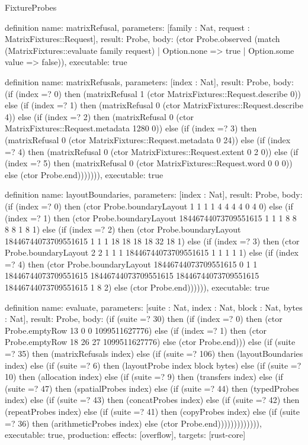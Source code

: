 \begin{lexlean}{FixtureProbes}
\begin{semanticmodule}
definition{
  name: matrixRefusal,
  parameters: [family : Nat, request : MatrixFixtures::Request],
  result: Probe,
  body: (ctor Probe.observed (match (MatrixFixtures::evaluate family request)
    | Option.none => true
    | Option.some value => false)),
  executable: true
}

definition{
  name: matrixRefusals,
  parameters: [index : Nat],
  result: Probe,
  body: (if (index =? 0) then (matrixRefusal 1 (ctor MatrixFixtures::Request.describe 0)) else (if (index =? 1) then (matrixRefusal 0 (ctor MatrixFixtures::Request.describe 4)) else (if (index =? 2) then (matrixRefusal 0 (ctor MatrixFixtures::Request.metadata 1280 0)) else (if (index =? 3) then (matrixRefusal 0 (ctor MatrixFixtures::Request.metadata 0 24)) else (if (index =? 4) then (matrixRefusal 0 (ctor MatrixFixtures::Request.extent 0 2 0)) else (if (index =? 5) then (matrixRefusal 0 (ctor MatrixFixtures::Request.word 0 0 0)) else (ctor Probe.end))))))),
  executable: true
}

definition{
  name: layoutBoundaries,
  parameters: [index : Nat],
  result: Probe,
  body: (if (index =? 0) then (ctor Probe.boundaryLayout 1 1 1 1 4 4 4 4 0 4 0) else (if (index =? 1) then (ctor Probe.boundaryLayout 18446744073709551615 1 1 1 8 8 8 8 1 8 1) else (if (index =? 2) then (ctor Probe.boundaryLayout 18446744073709551615 1 1 1 18 18 18 18 32 18 1) else (if (index =? 3) then (ctor Probe.boundaryLayout 2 2 1 1 1 18446744073709551615 1 1 1 1 1) else (if (index =? 4) then (ctor Probe.boundaryLayout 18446744073709551615 0 1 1 18446744073709551615 18446744073709551615 18446744073709551615 18446744073709551615 1 8 2) else (ctor Probe.end)))))),
  executable: true
}

definition{
  name: evaluate,
  parameters: [suite : Nat, index : Nat, block : Nat, bytes : Nat],
  result: Probe,
  body: (if (suite =? 30) then (if (index =? 0) then (ctor Probe.emptyRow 13 0 0 1099511627776) else (if (index =? 1) then (ctor Probe.emptyRow 18 26 27 1099511627776) else (ctor Probe.end))) else (if (suite =? 35) then (matrixRefusals index) else (if (suite =? 106) then (layoutBoundaries index) else (if (suite =? 6) then (layoutProbe index block bytes) else (if (suite =? 10) then (allocation index) else (if (suite =? 9) then (transfers index) else (if (suite =? 47) then (spatialProbes index) else (if (suite =? 44) then (typedProbes index) else (if (suite =? 43) then (concatProbes index) else (if (suite =? 42) then (repeatProbes index) else (if (suite =? 41) then (copyProbes index) else (if (suite =? 36) then (arithmeticProbes index) else (ctor Probe.end))))))))))))),
  executable: true,
  production: {effects: [overflow], targets: [rust-core]}
}


\end{semanticmodule}
\end{lexlean}
